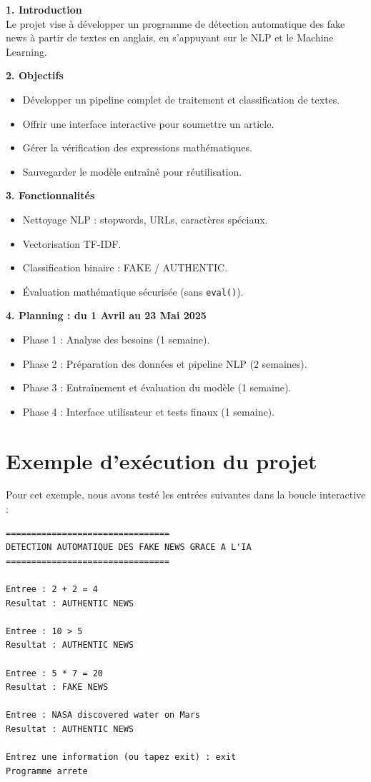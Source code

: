 \documentclass[a4paper, 12pt, twoside]{article}
\begin{document}
\textbf{1. Introduction}\\
Le projet vise à développer un programme de détection automatique des fake
news à partir de textes en anglais, en s'appuyant sur le NLP et le Machine
Learning.

\medskip
\textbf{2. Objectifs}
\begin{itemize}
  \item Développer un pipeline complet de traitement et classification de textes.
  \item Offrir une interface interactive pour soumettre un article.
  \item Gérer la vérification des expressions mathématiques.
  \item Sauvegarder le modèle entraîné pour réutilisation.
\end{itemize}

\medskip
\textbf{3. Fonctionnalités}
\begin{itemize}
  \item Nettoyage NLP : stopwords, URLs, caractères spéciaux.
  \item Vectorisation TF-IDF.
  \item Classification binaire : FAKE / AUTHENTIC.
  \item Évaluation mathématique sécurisée (sans \texttt{eval()}).
\end{itemize}

\medskip
\textbf{4. Planning : du 1 Avril au 23 Mai 2025}
\begin{itemize}
  \item Phase 1 : Analyse des besoins (1 semaine).
  \item Phase 2 : Préparation des données et pipeline NLP (2 semaines).
  \item Phase 3 : Entraînement et évaluation du modèle (1 semaine).
  \item Phase 4 : Interface utilisateur et tests finaux (1 semaine).
\end{itemize}

\section{Exemple d'exécution du projet}

Pour cet exemple, nous avons testé les entrées suivantes dans la boucle
interactive :

\begin{lstlisting}[language={}, title={Sortie console}]
================================
DETECTION AUTOMATIQUE DES FAKE NEWS GRACE A L'IA
================================

Entree : 2 + 2 = 4
Resultat : AUTHENTIC NEWS

Entree : 10 > 5
Resultat : AUTHENTIC NEWS

Entree : 5 * 7 = 20
Resultat : FAKE NEWS

Entree : NASA discovered water on Mars
Resultat : AUTHENTIC NEWS

Entrez une information (ou tapez exit) : exit
Programme arrete
\end{lstlisting}
\end{document}
